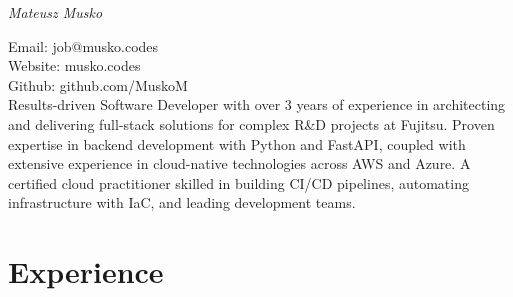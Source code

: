 \documentclass[a4paper, 12pt]{article} %
\begin{document}
{\itshape\huge Mateusz Musko\par}
Email: job@musko.codes \\
Website: musko.codes \\
Github: github.com/MuskoM \\

Results-driven Software Developer with over 3 years of experience in architecting and delivering full-stack solutions for complex R\&D projects at Fujitsu. Proven expertise in backend development with Python and FastAPI, coupled with extensive experience in cloud-native technologies across AWS and Azure. A certified cloud practitioner skilled in building CI/CD pipelines, automating infrastructure with IaC, and leading development teams.

\section{Experience}
\end{document}
